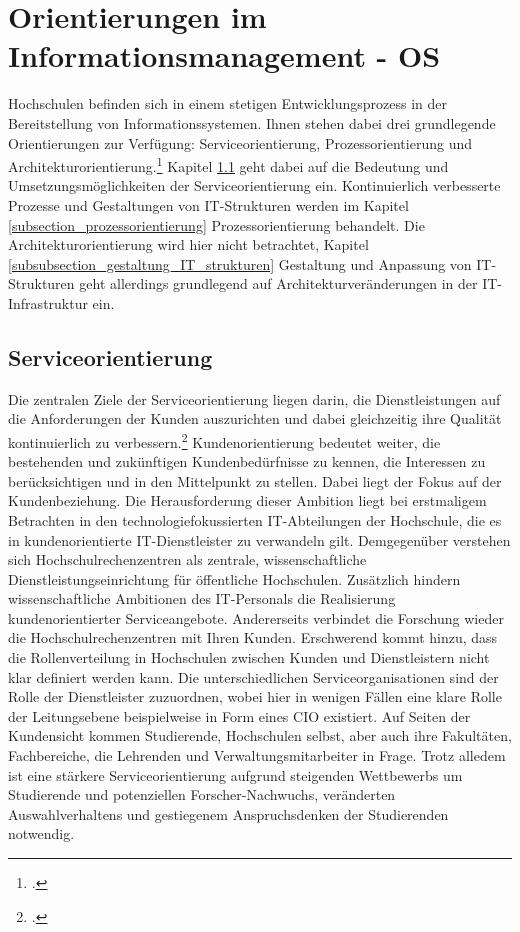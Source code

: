 \section{Orientierungen im Informationsmanagement - OS}

Hochschulen befinden sich in einem stetigen Entwicklungsprozess in der Bereitstellung von Informationssystemen. Ihnen stehen dabei drei grundlegende Orientierungen zur Verfügung: Serviceorientierung, Prozessorientierung und Architekturorientierung.\footcite{Zitat fehlt} Kapitel \ref{subsection_serviceorientierung} geht dabei auf die Bedeutung und Umsetzungsmöglichkeiten der Serviceorientierung ein. Kontinuierlich verbesserte Prozesse und Gestaltungen von IT-Strukturen werden im Kapitel \ref{subsection_prozessorientierung} Prozessorientierung behandelt. Die Architekturorientierung wird hier nicht betrachtet, Kapitel \ref{subsubsection_gestaltung_IT_strukturen} Gestaltung und Anpassung von IT-Strukturen geht allerdings grundlegend auf Architekturveränderungen in der IT-Infrastruktur ein.

\subsection{Serviceorientierung}
\label{subsection_serviceorientierung}
Die zentralen Ziele der Serviceorientierung liegen darin, die Dienstleistungen auf die Anforderungen der Kunden auszurichten und dabei gleichzeitig ihre Qualität kontinuierlich zu verbessern.\footcite{Zitat fehlt} Kundenorientierung bedeutet weiter, die bestehenden und zukünftigen Kundenbedürfnisse zu kennen, die Interessen zu berücksichtigen und in den Mittelpunkt zu stellen. Dabei liegt der Fokus auf der Kundenbeziehung. Die Herausforderung dieser Ambition liegt bei erstmaligem Betrachten in den technologiefokussierten IT-Abteilungen der Hochschule, die es in kundenorientierte IT-Dienstleister zu verwandeln gilt. Demgegenüber verstehen sich Hochschulrechenzentren als zentrale, wissenschaftliche Dienstleistungseinrichtung für öffentliche Hochschulen. Zusätzlich hindern wissenschaftliche Ambitionen des IT-Personals die Realisierung kundenorientierter Serviceangebote. Andererseits verbindet die Forschung wieder die Hochschulrechenzentren mit Ihren Kunden. Erschwerend kommt hinzu, dass die Rollenverteilung in Hochschulen zwischen Kunden und Dienstleistern nicht klar definiert werden kann. Die unterschiedlichen Serviceorganisationen sind der Rolle der Dienstleister zuzuordnen, wobei hier in wenigen Fällen eine klare Rolle der Leitungsebene beispielweise in Form eines CIO existiert. Auf Seiten der Kundensicht kommen Studierende, Hochschulen selbst, aber auch ihre Fakultäten, Fachbereiche, die Lehrenden und Verwaltungsmitarbeiter in Frage. Trotz alledem ist eine stärkere Serviceorientierung aufgrund steigenden Wettbewerbs um Studierende und potenziellen Forscher-Nachwuchs, veränderten Auswahlverhaltens und gestiegenem Anspruchsdenken der Studierenden notwendig.


